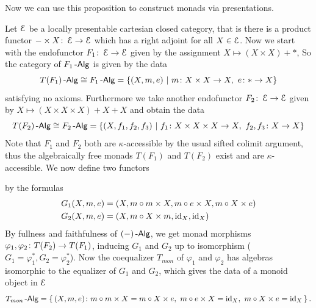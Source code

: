 \documentclass[a4paper,11pt,oneside,openany]{scrbook}
\begin{document}
Now we can use this proposition to construct monads via presentations.

\begin{exmp}
	Let $\operatorname{\mathcal{E}}$ be a locally presentable cartesian closed category, that is there
    is a product functor $- \times X \colon \operatorname{\mathcal{E}} \to \operatorname{\mathcal{E}}$ which has a right adjoint for
	all $X \in \operatorname{\mathcal{E}}$. Now we start with the endofunctor $F_{1} \colon \operatorname{\mathcal{E}} \to \operatorname{\mathcal{E}}$
    given by the assignment $X \mapsto (X \times X) + *$, So the category of
	$F_{1}\operatorname{-\mathsf{Alg}}$ is given by the data
	\begin{equation*}
		T(F_{1})\operatorname{-\mathsf{Alg}}\cong F_{1}\operatorname{-\mathsf{Alg}}=\{(X,m,e)\ |\ m\colon X \times X \to X,\ e\colon\ast\to X\}
	\end{equation*}
	satisfying no axioms. Furthermore we take another endofunctor $F_{2}\colon
    \operatorname{\mathcal{E}}\to\operatorname{\mathcal{E}}$ given by $X\mapsto (X\times X\times X)+X+X$ and obtain the
    data
	\begin{equation*}
		T(F_{2})\operatorname{-\mathsf{Alg}}\cong F_{2}\operatorname{-\mathsf{Alg}}=\{(X,f_{1},f_{2},f_{3})\ |\ f_{1}\colon X
        \times X\times X\to X,\ f_{2},f_{3}\colon X\to X\}
	\end{equation*}
	Note that $F_{1}$ and $F_{2}$ both are $\kappa$-accessible by the usual
    sifted colimit argument, thus the algebraically free monads $T(F_{1})$ and
    $T(F_{2})$ exist and are $\kappa$-accessible. We now define two functors
	\begin{center}
	\end{center}
	by the formulas
	\begin{align*}
        G_{1}(X,m,e) &= (X, m \circ m \times X, m \circ e \times X, m \circ X \times e) \\
        G_{2}(X,m,e) &= (X, m \circ X \times m, \operatorname{id}_{X}, \operatorname{id}_{X})
	\end{align*}
	By fullness and faithfulness of $(-)\operatorname{-\mathsf{Alg}}$, we get monad morphisms
    $\varphi_{1},\varphi_{2} \colon T(F_{2}) \to T(F_{1})$, inducing $G_{1}$ and
    $G_{2}$ up to isomorphism ($G_{1} = \varphi_{1}^{\ast},G_{2} =
    \varphi_{2}^{\ast}$). Now the coequalizer $T_{mon}$ of $\varphi_{1}$ and
    $\varphi_{2}$ has algebras isomorphic to the equalizer of $G_{1}$ and
    $G_{2}$, which gives the data of a monoid object in $\operatorname{\mathcal{E}}$
	\begin{equation*}
		T_{mon}\operatorname{-\mathsf{Alg}} = \left\lbrace\,(X,m,e)\colon m \circ m \times X = m \circ X \times e,\ m
        \circ e \times X = \operatorname{id}_{X},\ m \circ X \times e = \operatorname{id}_{X} \,\right\rbrace.
	\end{equation*}
\end{exmp}
\end{document}
